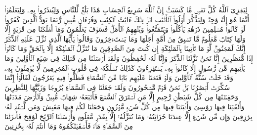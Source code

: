 \startbuffer[\q:14:51]
لِیَجۡزِیَ ٱللَّهُ كُلَّ نَفۡسࣲ مَّا كَسَبَتۡۚ إِنَّ ٱللَّهَ سَرِیعُ ٱلۡحِسَابِ%
\stopbuffer
\startbuffer[\q:14:52]
هَٰذَا بَلَٰغࣱ لِّلنَّاسِ وَلِیُنذَرُوا۟ بِهِۦ وَلِیَعۡلَمُوۤا۟ أَنَّمَا هُوَ إِلَٰهࣱ وَٰحِدࣱ وَلِیَذَّكَّرَ أُو۟لُوا۟ ٱلۡأَلۡبَٰبِ%
\stopbuffer
\startbuffer[\q:15:1]
الۤرۚ تِلۡكَ ءَایَٰتُ ٱلۡكِتَٰبِ وَقُرۡءَانࣲ مُّبِینࣲ%
\stopbuffer
\startbuffer[\q:15:2]
رُّبَمَا یَوَدُّ ٱلَّذِینَ كَفَرُوا۟ لَوۡ كَانُوا۟ مُسۡلِمِینَ%
\stopbuffer
\startbuffer[\q:15:3]
ذَرۡهُمۡ یَأۡكُلُوا۟ وَیَتَمَتَّعُوا۟ وَیُلۡهِهِمُ ٱلۡأَمَلُۖ فَسَوۡفَ یَعۡلَمُونَ%
\stopbuffer
\startbuffer[\q:15:4]
وَمَاۤ أَهۡلَكۡنَا مِن قَرۡیَةٍ إِلَّا وَلَهَا كِتَابࣱ مَّعۡلُومࣱ%
\stopbuffer
\startbuffer[\q:15:5]
مَّا تَسۡبِقُ مِنۡ أُمَّةٍ أَجَلَهَا وَمَا یَسۡتَءۡخِرُونَ%
\stopbuffer
\startbuffer[\q:15:6]
وَقَالُوا۟ یَٰۤأَیُّهَا ٱلَّذِی نُزِّلَ عَلَیۡهِ ٱلذِّكۡرُ إِنَّكَ لَمَجۡنُونࣱ%
\stopbuffer
\startbuffer[\q:15:7]
لَّوۡ مَا تَأۡتِینَا بِٱلۡمَلَٰۤئِكَةِ إِن كُنتَ مِنَ ٱلصَّٰدِقِینَ%
\stopbuffer
\startbuffer[\q:15:8]
مَا نُنَزِّلُ ٱلۡمَلَٰۤئِكَةَ إِلَّا بِٱلۡحَقِّ وَمَا كَانُوۤا۟ إِذࣰا مُّنظَرِینَ%
\stopbuffer
\startbuffer[\q:15:9]
إِنَّا نَحۡنُ نَزَّلۡنَا ٱلذِّكۡرَ وَإِنَّا لَهُۥ لَحَٰفِظُونَ%
\stopbuffer
\startbuffer[\q:15:10]
وَلَقَدۡ أَرۡسَلۡنَا مِن قَبۡلِكَ فِی شِیَعِ ٱلۡأَوَّلِینَ%
\stopbuffer
\startbuffer[\q:15:11]
وَمَا یَأۡتِیهِم مِّن رَّسُولٍ إِلَّا كَانُوا۟ بِهِۦ یَسۡتَهۡزِءُونَ%
\stopbuffer
\startbuffer[\q:15:12]
كَذَٰلِكَ نَسۡلُكُهُۥ فِی قُلُوبِ ٱلۡمُجۡرِمِینَ%
\stopbuffer
\startbuffer[\q:15:13]
لَا یُؤۡمِنُونَ بِهِۦ وَقَدۡ خَلَتۡ سُنَّةُ ٱلۡأَوَّلِینَ%
\stopbuffer
\startbuffer[\q:15:14]
وَلَوۡ فَتَحۡنَا عَلَیۡهِم بَابࣰا مِّنَ ٱلسَّمَاۤءِ فَظَلُّوا۟ فِیهِ یَعۡرُجُونَ%
\stopbuffer
\startbuffer[\q:15:15]
لَقَالُوۤا۟ إِنَّمَا سُكِّرَتۡ أَبۡصَٰرُنَا بَلۡ نَحۡنُ قَوۡمࣱ مَّسۡحُورُونَ%
\stopbuffer
\startbuffer[\q:15:16]
وَلَقَدۡ جَعَلۡنَا فِی ٱلسَّمَاۤءِ بُرُوجࣰا وَزَیَّنَّٰهَا لِلنَّٰظِرِینَ%
\stopbuffer
\startbuffer[\q:15:17]
وَحَفِظۡنَٰهَا مِن كُلِّ شَیۡطَٰنࣲ رَّجِیمٍ%
\stopbuffer
\startbuffer[\q:15:18]
إِلَّا مَنِ ٱسۡتَرَقَ ٱلسَّمۡعَ فَأَتۡبَعَهُۥ شِهَابࣱ مُّبِینࣱ%
\stopbuffer
\startbuffer[\q:15:19]
وَٱلۡأَرۡضَ مَدَدۡنَٰهَا وَأَلۡقَیۡنَا فِیهَا رَوَٰسِیَ وَأَنۢبَتۡنَا فِیهَا مِن كُلِّ شَیۡءࣲ مَّوۡزُونࣲ%
\stopbuffer
\startbuffer[\q:15:20]
وَجَعَلۡنَا لَكُمۡ فِیهَا مَعَٰیِشَ وَمَن لَّسۡتُمۡ لَهُۥ بِرَٰزِقِینَ%
\stopbuffer
\startbuffer[\q:15:21]
وَإِن مِّن شَیۡءٍ إِلَّا عِندَنَا خَزَاۤئِنُهُۥ وَمَا نُنَزِّلُهُۥۤ إِلَّا بِقَدَرࣲ مَّعۡلُومࣲ%
\stopbuffer
\startbuffer[\q:15:22]
وَأَرۡسَلۡنَا ٱلرِّیَٰحَ لَوَٰقِحَ فَأَنزَلۡنَا مِنَ ٱلسَّمَاۤءِ مَاۤءࣰ فَأَسۡقَیۡنَٰكُمُوهُ وَمَاۤ أَنتُمۡ لَهُۥ بِخَٰزِنِینَ%
